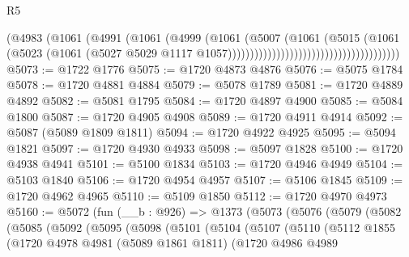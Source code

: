 \begin{lexlean}{R5}
\begin{coremodule}
                                                        (@4983
                                                          (@1061
                                                            (@4991
                                                              (@1061
                                                                (@4999
                                                                  (@1061
                                                                    (@5007
                                                                      (@1061
                                                                        (@5015
                                                                          (@1061
                                                                            (@5023
                                                                              (@1061
                                                                                (@5027
                                                                                  @5029
                                                                                  @1117
                                                                                  @1057)))))))))))))))))))))))))))))))))))))))
@5073 := @1722 @1776
@5075 := @1720 @4873 @4876
@5076 := @5075 @1784
@5078 := @1720 @4881 @4884
@5079 := @5078 @1789
@5081 := @1720 @4889 @4892
@5082 := @5081 @1795
@5084 := @1720 @4897 @4900
@5085 := @5084 @1800
@5087 := @1720 @4905 @4908
@5089 := @1720 @4911 @4914
@5092 := @5087 (@5089 @1809 @1811)
@5094 := @1720 @4922 @4925
@5095 := @5094 @1821
@5097 := @1720 @4930 @4933
@5098 := @5097 @1828
@5100 := @1720 @4938 @4941
@5101 := @5100 @1834
@5103 := @1720 @4946 @4949
@5104 := @5103 @1840
@5106 := @1720 @4954 @4957
@5107 := @5106 @1845
@5109 := @1720 @4962 @4965
@5110 := @5109 @1850
@5112 := @1720 @4970 @4973
@5160 := @5072
    (fun (__b : @926) =>
    @1373
      (@5073
        (@5076
          (@5079
            (@5082
              (@5085
                (@5092
                  (@5095
                    (@5098
                      (@5101
                        (@5104
                          (@5107
                            (@5110
                              (@5112
                                @1855
                                (@1720
                                  @4978
                                  @4981
                                  (@5089 @1861 @1811)
                                  (@1720
                                    @4986
                                    @4989

\end{coremodule}
\end{lexlean}
